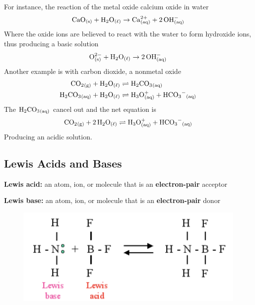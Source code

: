 For instance, the reaction of the metal oxide calcium oxide in water
\[
    \ch{CaO_{(s)}}+\ch{H2O_{(\ell)}}\to \ch{Ca^{2+}_{(aq)}}+\ch{2OH^-_{(aq)}}
\]
Where the oxide ions are believed to react with the water to form hydroxide ions, thus producing
a basic solution
\[
    \ch{O^{2-}_{(s)}}+\ch{H2O_{(\ell)}}\to \ch{2OH^-_{(aq)}}
\]
Another example is with carbon dioxide, a nonmetal oxide
\begin{align*}
    \ch{CO2_{(g)}}+\ch{H2O_{(\ell)}}&\rightleftharpoons \ch{H2CO3_{(aq)}}\\
    \ch{H2CO3_{(aq)}}+\ch{H2O_{(\ell)}}&\rightleftharpoons \ch{H3O^+_{(aq)}}+\ch{HCO3^-_{(aq)}}
\end{align*}
The $\ch{H2CO3_{(aq)}}$ cancel out and the net equation is
\[
    \ch{CO2_{(g)}}+\ch{2H2O_{(\ell)}}\rightleftharpoons \ch{H3O^+_{(aq)}}+\ch{HCO3^-_{(aq)}}
\]
Producing an acidic solution.

\subsection{Lewis Acids and Bases}
\begin{bulleted-list}
    \item \textbf{Lewis acid:} an atom, ion, or molecule that is an \textbf{electron-pair} acceptor
    \item \textbf{Lewis base:} an atom, ion, or molecule that is an \textbf{electron-pair} donor
\end{bulleted-list}

\begin{figure}[ht!]
    \centering
    \includegraphics[width=0.5 \textwidth]{../figures/lewis-acid-and-base.png}
\end{figure}
